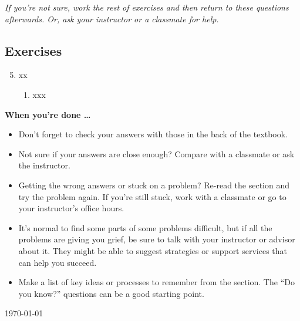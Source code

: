 \noindent \emph{If you're not sure, work the rest of exercises and then return to these questions afterwards.  Or, ask your instructor or a classmate for help.}

\subsection*{Exercises}

\begin{enumerate} 
\setcounter{enumi}{4}

\item xx
\begin{enumerate}
\item xxx
\end{enumerate}

\end{enumerate}

\bigskip

\noindent \textbf{When you're done \ldots}

\begin{itemize}
\item Don't forget to check your answers with those in the back of the textbook. 
\item Not sure if your answers are close enough? Compare with a classmate or ask the instructor.  
\item Getting the wrong answers or stuck on a problem?  Re-read the section and try the problem again.   If you're still stuck, work with a classmate or go to your instructor's office hours.
\item It's normal to find some parts of some problems difficult, but if all the problems are giving you grief, be sure to talk with your instructor or advisor about it.  They might be able to suggest strategies or support services that can help you succeed.
\item Make a list of key ideas or processes to remember from the section.  The ``Do you know?'' questions can be a good starting point.
\end{itemize}

\today

